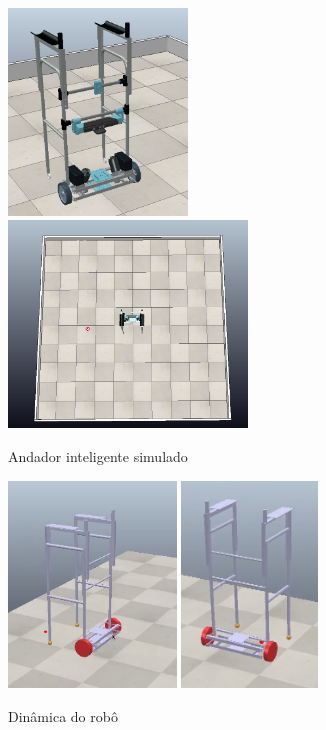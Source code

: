 \begin{figure}[H]
    \label{fig:cenario:completo}
    \centering
    \includegraphics[height=5.5cm]{figuras/robo_simulado_1.png}%
    \hspace{1cm}
    \includegraphics[height=5.5cm]{figuras/visao_cima.png}
    \caption{Andador inteligente simulado}
\end{figure}

\begin{figure}[H]
    \label{fig:dinamica:robo}
    \centering
    \includegraphics[height=5.5cm]{figuras/robo_dinamica_1.png}
    \hspace{1cm}
    \includegraphics[height=5.5cm]{figuras/robo_dinamica_2.png}
    \caption{Dinâmica do robô}
\end{figure}

